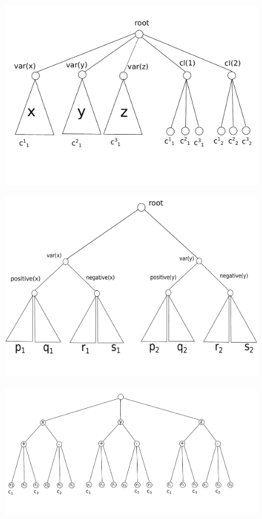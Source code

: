 \begin{figure}[htbp]
\includegraphics[width = \columnwidth]{figs/vc-instance-r2.pdf}
\end{figure}


\begin{figure}[htbp]
\includegraphics[width = \columnwidth]{figs/lemma-two-gadgets.pdf}
\end{figure}


\begin{figure}[htbp]
\includegraphics[width = \columnwidth]{figs/formula-example.pdf}
\end{figure}



